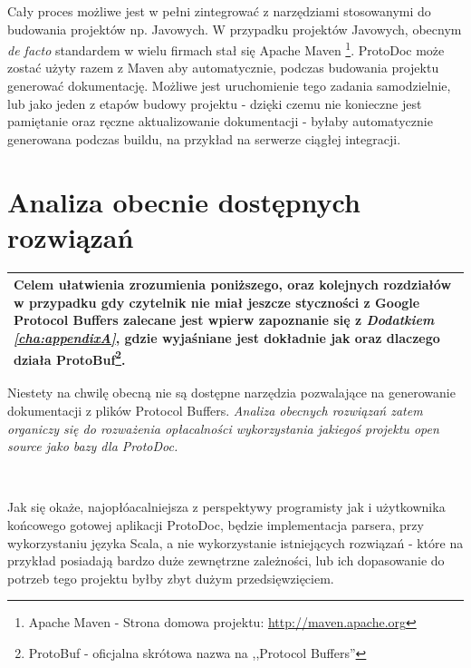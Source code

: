 \documentclass[pdflatex,11pt]{aghdpl}
\begin{document}
Cały proces możliwe jest w pełni zintegrować z narzędziami stosowanymi do budowania projektów np. Javowych. W przypadku projektów Javowych, obecnym \textit{de facto}
standardem w wielu firmach stał się Apache Maven \footnote[2]{Apache Maven - Strona domowa projektu: \href{http://maven.apache.org}{http://maven.apache.org}}.
ProtoDoc może zostać użyty razem z Maven aby automatycznie, podczas budowania projektu generować
dokumentację. Możliwe jest uruchomienie tego zadania samodzielnie, lub jako jeden z etapów budowy projektu - dzięki czemu nie konieczne jest pamiętanie oraz ręczne
aktualizowanie dokumentacji - byłaby automatycznie generowana podczas buildu, na przykład na serwerze ciągłej integracji.

\newpage

\section{Analiza obecnie dostępnych rozwiązań}
\label{sec:dostepneNarzedzia}


\begin{center}
  \begin{tabular}{ | p{\textwidth} |}
    \hline
      Celem ułatwienia zrozumienia poniższego, oraz kolejnych rozdziałów w przypadku gdy czytelnik nie miał 
      jeszcze styczności z Google Protocol Buffers zalecane jest wpierw
      zapoznanie się z \textit{Dodatkiem \ref{cha:appendixA}}, gdzie wyjaśniane jest dokładnie jak oraz dlaczego działa ProtoBuf\footnote[1]{ProtoBuf - oficjalna skrótowa nazwa na ,,Protocol Buffers''}. \\ \hline
  \end{tabular}
\end{center}


Niestety na chwilę obecną nie są dostępne narzędzia pozwalające na generowanie dokumentacji z plików Protocol Buffers.
\textit{Analiza obecnych rozwiązań zatem organiczy się do rozważenia opłacalności wykorzystania jakiegoś projektu open source jako bazy dla ProtoDoc.}

~\\\*

Jak się okaże, najopłóacalniejsza z perspektywy programisty jak i użytkownika końcowego gotowej aplikacji ProtoDoc, będzie implementacja parsera,
przy wykorzystaniu języka Scala, a nie wykorzystanie istniejących rozwiązań - które na przykład posiadają bardzo duże zewnętrzne zależności, lub
ich dopasowanie do potrzeb tego projektu byłby zbyt dużym przedsięwzięciem.
\end{document}
